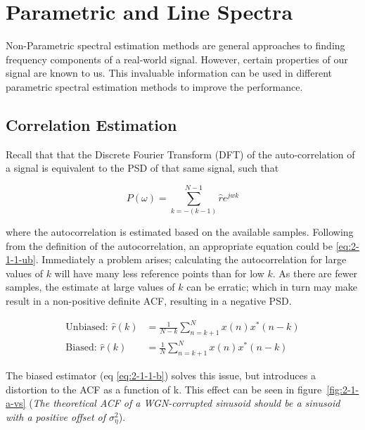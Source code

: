 \documentclass[main.tex]{subfiles}
\begin{document}
\section{Parametric and Line Spectra}

Non-Parametric spectral estimation methods are general approaches to finding frequency components of a real-world signal. However, certain properties of our signal are known to us. This invaluable information can be used in different parametric spectral estimation methods to improve the performance.


\subsection{Correlation Estimation}

Recall that that the Discrete Fourier Transform (DFT) of the auto-correlation of a signal is equivalent to the PSD of that same signal, such that

\begin{equation}
P(\omega) = \sum_{k=-(k-1)}^{N-1}\hat{r}e^{jwk}
\end{equation}

where the autocorrelation is estimated based on the available samples. Following from the definition of the autocorrelation, an appropriate equation could be \ref{eq:2-1-1-ub}. Immediately a problem arises; calculating the autocorrelation for large values of $k$ will have many less reference points than for low $k$.  As there are fewer samples, the estimate at large values of $k$ can be  erratic; which in turn may make result in a non-positive definite ACF, resulting in a negative PSD.


\begin{align}
\text{Unbiased: } \hat{r}(k) &= \frac{1}{N-k}\sum_{n=k+1}^{N}x(n)x^*(n-k) \label{eq:2-1-1-ub}\\
\text{Biased: } \hat{r}(k) &= \frac{1}{N}\sum_{n=k+1}^{N}x(n)x^*(n-k) \label{eq:2-1-1-b}
\end{align}


The biased estimator (eq \ref{eq:2-1-1-b}) solves this issue, but introduces a distortion to the ACF as a function of k. This effect can be seen in figure~\ref{fig:2-1-a-vs} (\textit{The theoretical ACF of a WGN-corrupted sinusoid should be a sinusoid with a positive offset of $\sigma_{\eta}^2$}).
\end{document}
